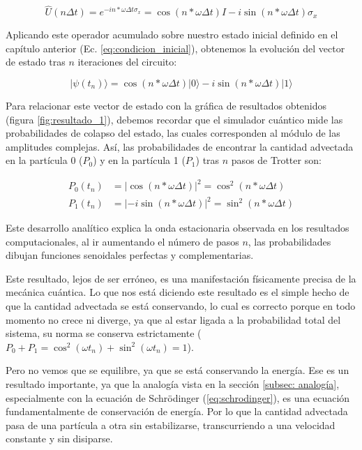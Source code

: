 \begin{equation}
    \hat{U}(n \Delta t) = e^{-i n*\omega \Delta t \sigma_x} = \cos\left(n*\omega \Delta t \right)I - i\sin\left(n*\omega \Delta t \right)\sigma_x
\end{equation}

Aplicando este operador acumulado sobre nuestro estado inicial definido en el capítulo anterior (Ec. \ref{eq:condicion_inicial}), obtenemos la evolución del vector de estado tras $n$ iteraciones del circuito:

\begin{equation}
    |\psi(t_n)\rangle = \cos\left(n*\omega \Delta t \right)|0\rangle - i\sin\left(n*\omega \Delta t \right)|1\rangle
    \label{eq:estado_final_n_pasos}
\end{equation}

Para relacionar este vector de estado con la gráfica de resultados obtenidos (figura \ref{fig:resultado_1}), debemos recordar que el simulador cuántico mide las probabilidades de colapso del estado, las cuales corresponden al módulo de las amplitudes complejas. Así, las probabilidades de encontrar la cantidad advectada en la partícula 0 ($P_0$) y en la partícula 1 ($P_1$) tras $n$ pasos de Trotter son:

\begin{align}
    P_0(t_n) &= \left| \cos\left(n*\omega \Delta t \right) \right|^2 = \cos^2\left(n*\omega \Delta t \right) \\
    P_1(t_n) &= \left| -i\sin\left(n*\omega \Delta t \right) \right|^2 = \sin^2\left(n*\omega \Delta t \right)
\end{align}

Este desarrollo analítico explica la onda estacionaria observada en los resultados computacionales, al ir aumentando el número de pasos $n$, las probabilidades dibujan funciones senoidales perfectas y complementarias. 

Este resultado, lejos de ser erróneo, es una manifestación físicamente precisa de la mecánica cuántica. Lo que nos está diciendo este resultado es el simple hecho de que la cantidad advectada se está conservando, lo cual es correcto porque en todo momento no crece ni diverge, ya que al estar ligada a la probabilidad total del sistema, su norma se conserva estrictamente ($P_0 + P_1 = \cos^2(\omega t_n) + \sin^2(\omega t_n) = 1$). 

Pero no vemos que se equilibre, ya que se está conservando la energía. Ese es un resultado importante, ya que la analogía vista en la sección \ref{subsec: analogía}, especialmente con la ecuación de Schrödinger (\ref{eq:schrodinger}), es una ecuación fundamentalmente de conservación de energía. Por lo que la cantidad advectada pasa de una partícula a otra sin estabilizarse, transcurriendo a una velocidad constante y sin disiparse. 


